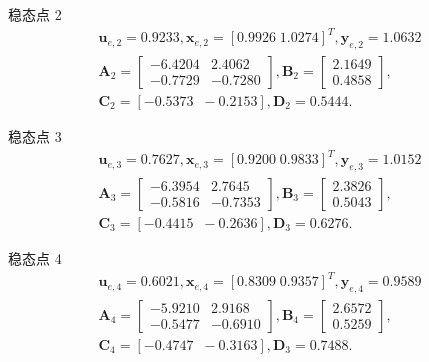 \documentclass{article}
\begin{document}
稳态点 2
\begin{equation}
\begin{matrix}
\bm{u}_{e,2}= 0.9233,\bm{x}_{e,2}=[0.9926\;1.0274]^{T},\bm{y}_{e,2} = 1.0632\\
\mathbf{A}_2=
\begin{bmatrix}
-6.4204 & 2.4062\\
-0.7729 & -0.7280
\end{bmatrix},
\mathbf{B}_2=
\begin{bmatrix}
 2.1649 \\
 0.4858
\end{bmatrix},\\
\mathbf{C}_2 = [-0.5373\;\;-0.2153],\mathbf{D}_2 = 0.5444.
\end{matrix}
\end{equation}

稳态点 3
\begin{equation}
\begin{matrix}
\bm{u}_{e,3}=0.7627,\bm{x}_{e,3}=[0.9200\;0.9833]^{T},\bm{y}_{e,3} = 1.0152\\
\mathbf{A}_3=
\begin{bmatrix}
-6.3954 & 2.7645\\
-0.5816 & -0.7353
\end{bmatrix},
\mathbf{B}_3=
\begin{bmatrix}
 2.3826 \\
 0.5043
\end{bmatrix},\\
\mathbf{C}_3 = [-0.4415\;\;-0.2636],\mathbf{D}_3 = 0.6276.
\end{matrix}
\end{equation}

稳态点 4
\begin{equation}
\begin{matrix}
\bm{u}_{e,4}=0.6021,\bm{x}_{e,4}=[0.8309\;0.9357]^{T},\bm{y}_{e,4} = 0.9589\\
\mathbf{A}_4=
\begin{bmatrix}
-5.9210 & 2.9168\\
-0.5477 & -0.6910
\end{bmatrix},
\mathbf{B}_4=
\begin{bmatrix}
 2.6572 \\
 0.5259
\end{bmatrix},\\
\mathbf{C}_4 = [-0.4747\;\;-0.3163],\mathbf{D}_3 = 0.7488.
\end{matrix}
\end{equation}
\end{document}
